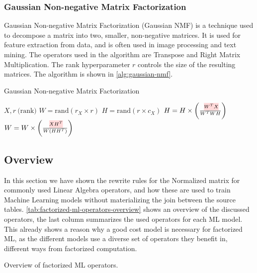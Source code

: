 \subsubsection{Gaussian Non-negative Matrix Factorization}
Gaussian Non-negative Matrix Factorization (Gaussian NMF) is a technique used to decompose a matrix into two, smaller, non-negative matrices. It is used for feature extraction from data, and is often used in image processing and text mining. The operators used in the algorithm are Transpose and Right Matrix Multiplication. The rank hyperparameter $r$ controls the size of the resulting matrices. The algorithm is shown in \autoref{alg:gaussian-nmf}.

\begin{algorithm}[ht]
    \caption[Gaussian NMF]{Gaussian Non-negative Matrix Factorization
        \cite{morpheus}}\label{alg:gaussian-nmf}
    \begin{algorithmic}
        \Require $X, r\ \text{(rank)}$
        \State $W = \text{rand}(r_X \times r)$ 
        \State $H = \text{rand}(r \times c_X)$ 
        \State $H = H \times \left(\frac{\text{\red{$W^T X$}}}{W^T W H}\right)$
        \State $W = W \times \left(\frac{\text{\red{$X H^T$}}}{W(H H^T)}\right)$
        \EndFor
    \end{algorithmic}
\end{algorithm}


\subsection{Overview}
\label{subsec:factorized-ml-summary}
In this section we have shown the rewrite rules for the Normalized matrix for commonly used Linear Algebra operators, and how these are used to train Machine Learning models without materializing the join between the source tables. \autoref{tab:factorized-ml-operators-overview} shows an overview of the discussed operators, the last column summarizes the used operators for each ML model. This already shows a reason why a good cost model is necessary for factorized ML, as the different models use a diverse set of operators they benefit in, different ways from factorized computation.

\begin{table}[ht]
    \small
    \resizebox{\textwidth}{!}{%
        }
    \caption{Overview of factorized ML operators.}
    \label{tab:factorized-ml-operators-overview}
\end{table}

